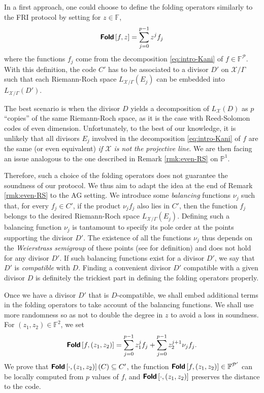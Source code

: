 \documentclass[a4paper,USenglish,autoref]{lipics-v2021}
\newcommand\F{\mathbb{F}}
\newcommand\PP{\mathbb{P}}
\newcommand\fold[1]{\textsf{\textbf{Fold}}\left[#1\right]}
\newcommand\calX{\mathcal{X}}
\newcommand\calP{\mathcal{P}}
\begin{document}
\medskip

In a first approach, one could choose to define the folding operators similarly to the \textsf{FRI} protocol by setting for $z \in \F$, \[\fold{f,z}=\sum_{j=0}^{p-1} z^j f_j\] where the functions $f_j$ come from the decomposition \eqref{eq:intro-Kani} of $f \in \F^\calP$. With this definition, the code $C'$ has to be associated to a divisor $D'$ on $\calX/\Gamma$ such that each Riemann-Roch space $L_{\calX / \Gamma}(E_j)$ can be embedded into $L_{\calX / \Gamma}(D')$.

The best scenario is when the divisor $D$ yields a decomposition of $L_\calX(D)$ as $p$ ``copies'' of the same Riemann-Roch space, as it is the case with Reed-Solomon codes of even dimension.  Unfortunately, to the best of our knowledge, it is unlikely that all divisors $E_j$ involved in the decomposition \eqref{eq:intro-Kani} of $f$ are the same (or even equivalent) \emph{if $\calX$ is not the projective line}. We are then facing an issue analogous to the one described in Remark \ref{rmk:even-RS} on $\PP^1$.

Therefore, such a choice of the folding operators does not guarantee the soundness of our protocol.     We thus aim to adapt the idea at the end of Remark \ref{rmk:even-RS} to the AG setting. We introduce some \emph{balancing} functions $\nu_j$ such that, for every $f_j \in C'$, if the product $\nu_j f_j$ also lies in $C'$, then the function $f_j$ belongs to the desired Riemann-Roch space $L_{\calX / \Gamma}(E_j)$. Defining such a balancing function $\nu_j$ is tantamount to specify its pole order at the points supporting the divisor $D'$. The existence of all the functions $\nu_j$ thus depends on the \emph{Weierstrass semigroup} of these points (see \cite[Section 6.6]{HKT13} for definition) and does not hold for any divisor $D'$. If such balancing functions exist for a divisor $D'$, we say that $D'$ is \emph{compatible} with $D$. Finding a convenient divisor $D'$ compatible with a given divisor $D$ is definitely the trickiest part in defining the folding operators properly.

Once we have a divisor $D'$ that is $D$-compatible, we shall embed additional terms in the folding operators to take account of the balancing functions. We shall use more randomness so as not to double the degree in $z$ to avoid a loss in soundness. For $(z_1,z_2) \in \F^2$, we set
\[\fold{f,(z_1,z_2)}=\sum_{j=0}^{p-1} z_1^j f_j+\sum_{j=0}^{p-1} z_2^{j+1} \nu_j f_j.\]
We prove that $\fold{\cdot,(z_1,z_2)}(C) \subseteq C'$, the function $\fold{f,(z_1,z_2)} \in \F^{\calP'}$ can be locally computed from $p$ values of $f$, and $\fold{\cdot,(z_1,z_2)}$ preserves the distance to the code.
\end{document}
